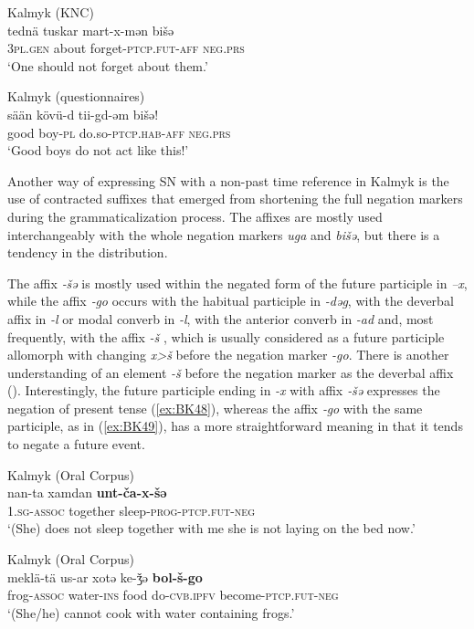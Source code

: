 \documentclass[output=paper]{langsci/langscibook}
\begin{document}
\ea Kalmyk (KNC) \label{ex:BK46}\\
	\gll tednä		tuskar	mart-x-mǝn			bišǝ\\
	\textsc{3pl.gen}	about		forget-\textsc{ptcp.fut-aff}	\textsc{neg.prs}\\
	\glt `One should not forget about them.'
\z

\ea Kalmyk (questionnaires) \label{ex:BK47}\\
	\gll sään	kövü-d	tii-gd-ǝm				bišǝ!\\
	good	boy-\textsc{pl}	do.so-\textsc{ptcp.hab-aff}	\textsc{neg.prs}\\
	\glt `Good boys do not act like this!'
\z


Another way of expressing SN with a non-past time reference in Kalmyk is the use of contracted suffixes that emerged from shortening the full negation markers during the grammaticalization process. The affixes are mostly used interchangeably with the whole negation markers \textit{uga} and \textit{bišǝ}, but there is a tendency in the distribution.

The affix \textit{‑šǝ} is mostly used within the negated form of the future participle in \textit{–x}, while the affix \textit{‑go} occurs with the habitual participle in \textit{-dǝg}, with the deverbal affix in \textit{-l} or modal converb in \textit{-l}, with the anterior converb in \textit{-ad} and, most frequently, with the affix \textit{-š} \citep[13]{baranova2018a}, which is usually considered as a future participle allomorph with changing \textit{x>š} before the negation marker \textit{-go}. There is another understanding of an element \textit{-š} before the negation marker as the deverbal affix (\citeauthor{brosig2015a}). Interestingly, the future participle ending in \textit{-x} with affix \textit{‑šǝ} expresses the negation of present tense (\ref{ex:BK48}), whereas the affix \textit{‑go} with the same participle, as in (\ref{ex:BK49}), has a more straightforward meaning in that it tends to negate a future event.

\ea Kalmyk (Oral Corpus) \label{ex:BK48}\\
	\gll nan-ta			xamdan	\textbf{unt-ča-x-šǝ}\\
	1.\textsc{sg-assoc}	together	sleep-\textsc{prog-ptcp.fut-neg}\\
	\glt `(She) does not sleep together with me {she is not laying on the bed now}.'
\z

\ea Kalmyk (Oral Corpus) \label{ex:BK49}\\
	\gll meklä-tä		us-ar			xotǝ	ke-ǯǝ	\textbf{bol-š-go}\\
	frog-\textsc{assoc}	water-\textsc{ins}	food	do-\textsc{cvb.ipfv}	become-\textsc{ptcp.fut-neg}\\
	\glt `(She/he) cannot cook with water containing frogs.'
\z
\end{document}
